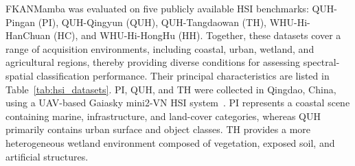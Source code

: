 \documentclass{revision_assets/ieeeaccess_revision}
\begin{document}
FKANMamba was evaluated on five publicly available HSI benchmarks: QUH-Pingan (PI), QUH-Qingyun (QUH), QUH-Tangdaowan (TH), WHU-Hi-HanChuan (HC), and WHU-Hi-HongHu (HH). Together, these datasets cover a range of acquisition environments, including coastal, urban, wetland, and agricultural regions, thereby providing diverse conditions for assessing spectral-spatial classification performance. Their principal characteristics are listed in Table~\ref{tab:hsi_datasets}. PI, QUH, and TH were collected in Qingdao, China, using a UAV-based Gaiasky mini2-VN HSI system~\cite{ref30}. PI represents a coastal scene containing marine, infrastructure, and land-cover categories, whereas QUH primarily contains urban surface and object classes. TH provides a more heterogeneous wetland environment composed of vegetation, exposed soil, and artificial structures.

\end{document}
